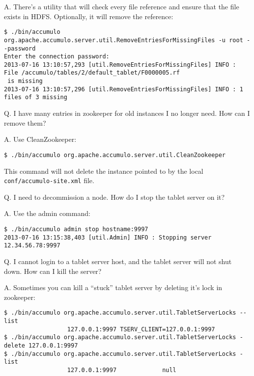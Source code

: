 A. There's a utility that will check every file reference and ensure
that the file exists in HDFS.  Optionally, it will remove the
reference:

\begingroup\fontsize{8pt}{8pt}\selectfont\begin{verbatim}
$ ./bin/accumulo org.apache.accumulo.server.util.RemoveEntriesForMissingFiles -u root --password
Enter the connection password: 
2013-07-16 13:10:57,293 [util.RemoveEntriesForMissingFiles] INFO : File /accumulo/tables/2/default_tablet/F0000005.rf
 is missing
2013-07-16 13:10:57,296 [util.RemoveEntriesForMissingFiles] INFO : 1 files of 3 missing
\end{verbatim}\endgroup

Q. I have many entries in zookeeper for old instances I no longer need.  How can I remove them?

A. Use CleanZookeeper:

\begingroup\fontsize{8pt}{8pt}\selectfont\begin{verbatim}
$ ./bin/accumulo org.apache.accumulo.server.util.CleanZookeeper
\end{verbatim}\endgroup

This command will not delete the instance pointed to by the local \texttt{conf/accumulo-site.xml} file.

Q. I need to decommission a node.  How do I stop the tablet server on it?

A. Use the admin command:

\begingroup\fontsize{8pt}{8pt}\selectfont\begin{verbatim}
$ ./bin/accumulo admin stop hostname:9997
2013-07-16 13:15:38,403 [util.Admin] INFO : Stopping server 12.34.56.78:9997
\end{verbatim}\endgroup

Q. I cannot login to a tablet server host, and the tablet server will not shut down.  How can I kill the server?

A. Sometimes you can kill a ``stuck'' tablet server by deleting it's lock in zookeeper:

\begingroup\fontsize{8pt}{8pt}\selectfont\begin{verbatim}
$ ./bin/accumulo org.apache.accumulo.server.util.TabletServerLocks --list
                  127.0.0.1:9997 TSERV_CLIENT=127.0.0.1:9997
$ ./bin/accumulo org.apache.accumulo.server.util.TabletServerLocks -delete 127.0.0.1:9997
$ ./bin/accumulo org.apache.accumulo.server.util.TabletServerLocks -list
                  127.0.0.1:9997             null
\end{verbatim}\endgroup

